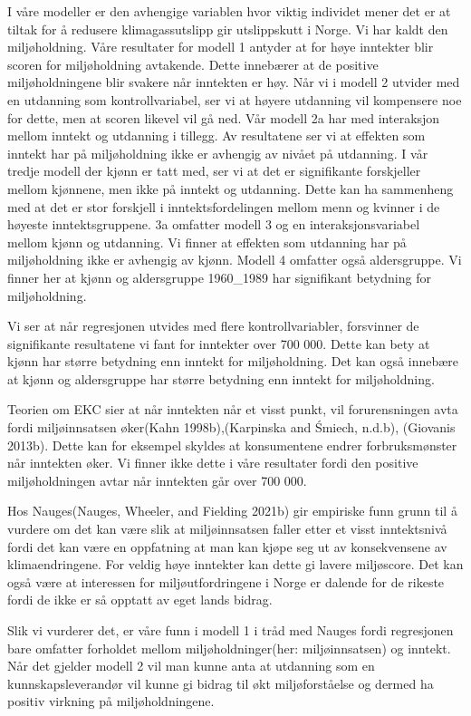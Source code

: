 \documentclass[
  12pt,
  letterpaper,
  DIV=11,
  numbers=noendperiod]{scrartcl}
\begin{document}
I våre modeller er den avhengige variablen hvor viktig individet mener
det er at tiltak for å redusere klimagassutslipp gir utslippskutt i
Norge. Vi har kaldt den miljøholdning. Våre resultater for modell 1
antyder at for høye inntekter blir scoren for miljøholdning avtakende.
Dette innebærer at de positive miljøholdningene blir svakere når
inntekten er høy. Når vi i modell 2 utvider med en utdanning som
kontrollvariabel, ser vi at høyere utdanning vil kompensere noe for
dette, men at scoren likevel vil gå ned. Vår modell 2a har med
interaksjon mellom inntekt og utdanning i tillegg. Av resultatene ser vi
at effekten som inntekt har på miljøholdning ikke er avhengig av nivået
på utdanning. I vår tredje modell der kjønn er tatt med, ser vi at det
er signifikante forskjeller mellom kjønnene, men ikke på inntekt og
utdanning. Dette kan ha sammenheng med at det er stor forskjell i
inntektsfordelingen mellom menn og kvinner i de høyeste
inntektsgruppene. 3a omfatter modell 3 og en interaksjonsvariabel mellom
kjønn og utdanning. Vi finner at effekten som utdanning har på
miljøholdning ikke er avhengig av kjønn. Modell 4 omfatter også
aldersgruppe. Vi finner her at kjønn og aldersgruppe 1960\_1989 har
signifikant betydning for miljøholdning.

Vi ser at når regresjonen utvides med flere kontrollvariabler,
forsvinner de signifikante resultatene vi fant for inntekter over 700
000. Dette kan bety at kjønn har større betydning enn inntekt for
miljøholdning. Det kan også innebære at kjønn og aldersgruppe har større
betydning enn inntekt for miljøholdning.

Teorien om EKC sier at når inntekten når et visst punkt, vil
forurensningen avta fordi miljøinnsatsen øker(Kahn 1998b),(Karpinska and
Śmiech, n.d.b), (Giovanis 2013b). Dette kan for eksempel skyldes at
konsumentene endrer forbruksmønster når inntekten øker. Vi finner ikke
dette i våre resultater fordi den positive miljøholdningen avtar når
inntekten går over 700 000.

Hos Nauges(Nauges, Wheeler, and Fielding 2021b) gir empiriske funn grunn
til å vurdere om det kan være slik at miljøinnsatsen faller etter et
visst inntektsnivå fordi det kan være en oppfatning at man kan kjøpe seg
ut av konsekvensene av klimaendringene. For veldig høye inntekter kan
dette gi lavere miljøscore. Det kan også være at interessen for
miljøutfordringene i Norge er dalende for de rikeste fordi de ikke er så
opptatt av eget lands bidrag.

Slik vi vurderer det, er våre funn i modell 1 i tråd med Nauges fordi
regresjonen bare omfatter forholdet mellom miljøholdninger(her:
miljøinnsatsen) og inntekt. Når det gjelder modell 2 vil man kunne anta
at utdanning som en kunnskapsleverandør vil kunne gi bidrag til økt
miljøforståelse og dermed ha positiv virkning på miljøholdningene.
\end{document}
